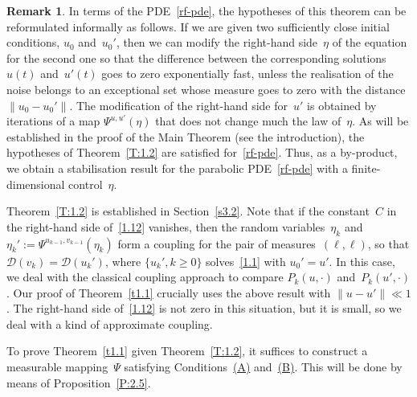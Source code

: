 \documentclass[11pt]{article}
\theoremstyle{plain}
\theoremstyle{definition}
\newtheorem{remark}[theorem]{Remark}
\let\mathcal\mathscr
\theoremstyle{plain}
\numberwithin{equation}{section}
\newcommand{\DD}{{\mathcal D}}
\begin{document}
\begin{remark}
In terms of the PDE~\eqref{rf-pde}, the hypotheses of this theorem can be reformulated informally as follows. If we are given two sufficiently close initial conditions, $u_0$ and~$u_0'$, then we can modify the right-hand side~$\eta$ of the equation for the second one so that the difference between the corresponding solutions~$u(t)$ and~$u'(t)$ goes to zero exponentially fast, unless the realisation of the noise belongs to an exceptional set whose measure goes to zero with the distance $\|u_0-u_0'\|$. The modification of the right-hand side for~$u'$ is obtained by iterations of a map $\Psi^{u,u'}(\eta)$ that does not change much the law of~$\eta$. As will be established in the proof of the Main Theorem (see the introduction), the hypotheses of Theorem~\ref{T:1.2} are satisfied for~\eqref{rf-pde}. Thus, as a by-product, we obtain a stabilisation result for the parabolic PDE~\eqref{rf-pde} with a finite-dimensional control~$\eta$.
\end{remark}

Theorem~\ref{T:1.2} is established in Section~\ref{s3.2}. Note that if the constant~$C$ in the right-hand side of~\eqref{1.12} vanishes, then the random variables~$\eta_k$ and $\eta_k':=\varPsi^{u_{k-1},v_{k-1}}(\eta_k)$ form a coupling for the pair of measures~$(\ell,\ell)$, so that $\DD(v_k)\!=\!\DD(u_k')$, where \hbox{$\{u_k',k\!\ge\!0\}$} solves~\eqref{1.1} with $u_0'=u'$. In this case, we deal with the classical coupling approach to compare $P_k(u,\cdot)$ and~$P_k(u',\cdot)$. Our proof of Theorem~\ref{t1.1} crucially uses the above result with $\|u-u'\|\ll1$. The right-hand side of~\eqref{1.12} is not zero in this situation, but it is small, so we deal with a kind of approximate coupling.

To prove Theorem~\ref{t1.1} given Theorem~\ref{T:1.2}, it suffices to construct a measurable mapping~$\varPsi$ satisfying Conditions~\hyperlink{(A)}{(A)} and~\hyperlink{(B)}{(B)}. This will be done by means of Proposition~\ref{P:2.5}.
\end{document}
